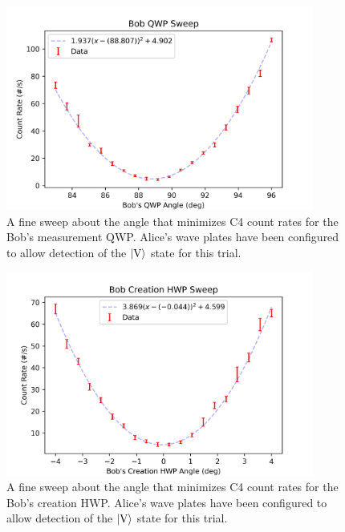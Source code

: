 \documentclass{paper}[11pt]
\begin{document}
	\begin{figure}[p]
		\centering
		\includegraphics[width=0.9\textwidth]{BQWP/BQWP_sweep0.png}
		\caption{A fine sweep about the angle that minimizes C4 count rates for the Bob's measurement QWP. Alice's wave plates have been configured to allow detection of the $\ket{\text{V}}$ state for this trial.}
		\label{fig:BQWP minimum fit}
	\end{figure}
	\begin{figure}[p]
		\centering
		\includegraphics[width=0.9\textwidth]{BCHWP/BCHWP_sweep0.png}
		\caption{A fine sweep about the angle that minimizes C4 count rates for the Bob's creation HWP. Alice's wave plates have been configured to allow detection of the $\ket{\text{V}}$ state for this trial.}
		\label{fig:BCHWP minimum fit}
	\end{figure}
\end{document}
